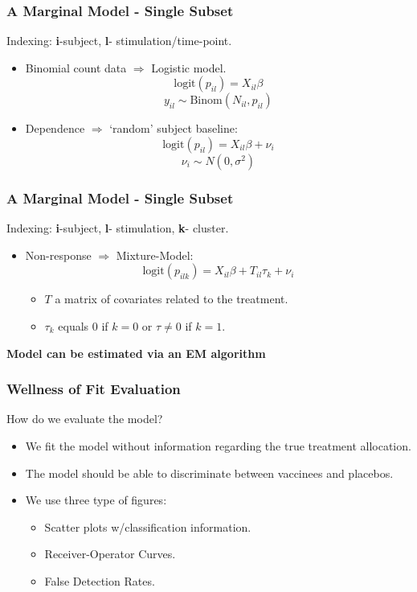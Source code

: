 \documentclass{beamer}
\theoremstyle{definition}
\begin{document}
\begin{frame}
\frametitle{A Marginal Model - Single Subset}
\begin{framed}
Indexing: \textbf{i}-subject, \textbf{l}- stimulation/time-point.
\end{framed}

\begin{itemize}
\item Binomial count data $\Rightarrow$ Logistic model.
$$
\text{logit}(p_{il}) = X_{il} \beta
$$$$
y_{il} \sim \text{Binom}(N_{il}, p_{il})
$$

\pause
\item Dependence $\Rightarrow$ `random' subject baseline:
$$
\text{logit}(p_{il}) = X_{il} \beta + \nu_i
$$$$
\nu_i \sim N(0, \sigma^{2})
$$
\end{itemize}
\end{frame}


\begin{frame}
\frametitle{A Marginal Model - Single Subset}
\begin{framed}
Indexing: \textbf{i}-subject, \textbf{l}- stimulation, \textbf{k}- cluster.
\end{framed}

\begin{itemize}
\item Non-response $\Rightarrow$ Mixture-Model:
$$
\text{logit}(p_{ilk}) = X_{il} \beta + T_{il}\tau_{k} + \nu_i
$$
	\begin{itemize}
	\item $T$ a matrix of covariates related to the treatment.
	\item $\tau_k$ equals $0$ if $k=0$ or $\tau\neq0$ if $k = 1$.
	\end{itemize}
\end{itemize}

\pause
\vspace{0.3 cm}
\textbf{Model can be estimated via an EM algorithm}
\end{frame}


\begin{frame}
\frametitle{Wellness of Fit Evaluation}
How do we evaluate the model?
\begin{itemize}
\item We fit the model without information regarding the true treatment allocation. 
\vspace{0.3 cm}
\item The model should be able to discriminate between vaccinees and placebos.
\vspace{0.3 cm}
\pause
\item We use three type of figures:
	\begin{itemize}
	\item Scatter plots w/classification information.
	\item Receiver-Operator Curves.
	\item False Detection Rates. 
	\end{itemize}
\end{itemize}
\end{frame}
\end{document}
